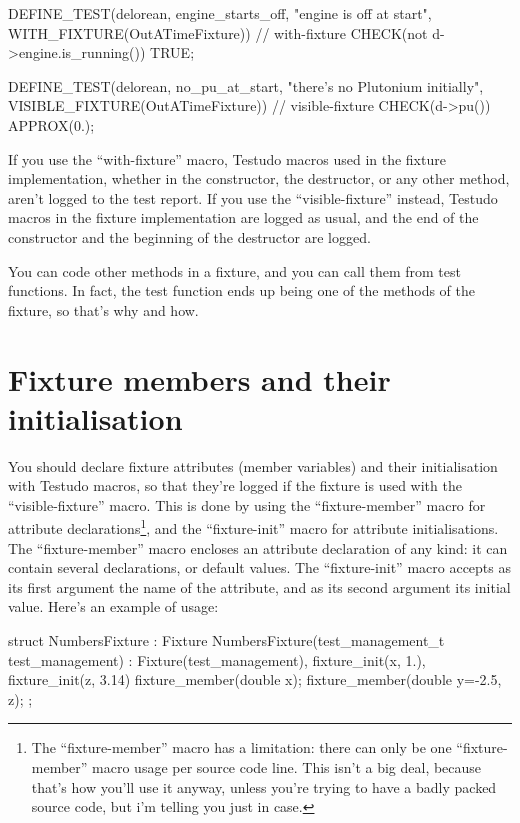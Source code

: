 \documentclass[twoside, a4paper, article]{memoir}
\begin{document}
\begin{cpplisting}
DEFINE_TEST(delorean,
            engine_starts_off, "engine is off at start",
            WITH_FIXTURE(OutATimeFixture)) // with-fixture
{
  CHECK(not d->engine.is_running()) TRUE;
}

DEFINE_TEST(delorean,
            no_pu_at_start, "there's no Plutonium initially",
            VISIBLE_FIXTURE(OutATimeFixture)) // visible-fixture
{
  CHECK(d->pu()) APPROX(0.);
}
\end{cpplisting}

If you use the ``with-fixture'' macro, Testudo macros used in the fixture
implementation, whether in the constructor, the destructor, or any other
method, aren't logged to the test report.  If you use the ``visible-fixture''
instead, Testudo macros in the fixture implementation are logged as usual, and
the end of the constructor and the beginning of the destructor are logged.

You can code other methods in a fixture, and you can call them from test
functions.  In fact, the test function ends up being one of the methods of the
fixture, so that's why and how.

\section{Fixture members and their initialisation}
\label{sec:fixture-members-and-initialisation}

You should declare fixture attributes (member variables) and their
initialisation with Testudo macros, so that they're logged if the fixture is
used with the ``visible-fixture'' macro.  This is done by using the
``fixture-member'' macro for attribute declarations\footnote{The
  ``fixture-member'' macro has a limitation: there can only be one
  ``fixture-member'' macro usage per source code line.  This isn't a big deal,
  because that's how you'll use it anyway, unless you're trying to have a badly
  packed source code, but i'm telling you just in case.}, and the
``fixture-init'' macro for attribute initialisations.  The ``fixture-member''
macro encloses an attribute declaration of any kind: it can contain several
declarations, or default values.  The ``fixture-init'' macro accepts as its
first argument the name of the attribute, and as its second argument its
initial value.  Here's an example of usage:
\begin{cpplisting}
struct NumbersFixture : Fixture {
  NumbersFixture(test_management_t test_management)
    : Fixture(test_management),
      fixture_init(x, 1.), fixture_init(z, 3.14) { }
  fixture_member(double x);
  fixture_member(double y=-2.5, z);
};
\end{cpplisting}
\end{document}
